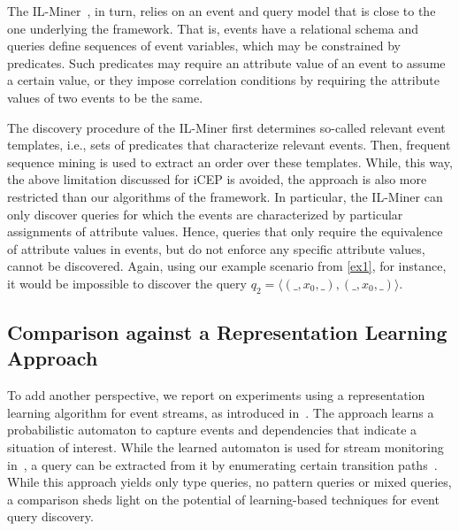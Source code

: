 The IL-Miner~\cite{ilminer}, in turn, relies on an event and query model
that is close to the one underlying the \sys{} framework. That is, events
have a relational schema and queries define sequences of event variables,
which may be constrained by predicates. Such predicates may require an
attribute value of an event to assume a certain value, or they impose
correlation conditions by requiring the attribute values of two events to be
the same.

The discovery procedure of the IL-Miner first determines so-called relevant
event templates, i.e., sets of predicates that characterize relevant events.
Then, frequent sequence mining is used to extract an order over these
templates. While, this way, the above limitation discussed for iCEP is
avoided, the approach is also more restricted than our algorithms of the
\sys{} framework. In particular, the IL-Miner can only discover queries for
which the events are characterized by particular assignments of attribute
values. Hence, queries that only require the equivalence of attribute values
in events, but do not enforce any specific attribute values, cannot be
discovered. Again, using our example scenario from \autoref{ex1}, for
instance, it would be impossible to discover the query
$q_2 = \langle (\_,x_0,\_),(\_,x_0,\_)\rangle$.



\subsection{Comparison against a Representation Learning Approach}
\label{sec:learning}

To add another perspective, we report on experiments using a representation
learning algorithm for event streams, as introduced in~\cite{yanli2021}. The
approach learns a probabilistic
automaton to capture events and dependencies that indicate a situation of
interest. While the learned automaton is used for stream monitoring
in~\cite{yanli2021}, a query can be extracted from it by enumerating certain
transition paths~\cite{makowsky2012}. While this
approach
yields only type queries, no pattern queries or mixed queries, a comparison
sheds light on the potential of learning-based techniques for event query
discovery.


